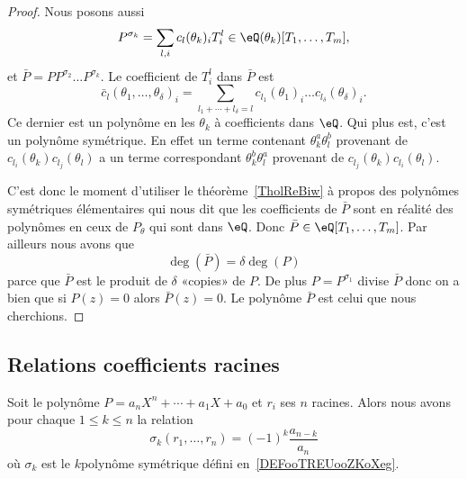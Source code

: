 \begin{proof}
    Nous posons aussi
    \begin{equation}
        P^{\sigma_k}=\sum_{l,i} c_l(\theta_k)_iT_i^l\in \eQ(\theta_k)[T_1,\ldots, T_m],
    \end{equation}
    et \( \bar P=PP^{\sigma_2}\ldots P^{\sigma_k}\). Le coefficient de \( T_i^l\) dans \( \bar P\) est
    \begin{equation}
        \bar c_l(\theta_1,\ldots, \theta_{\delta})_i=\sum_{l_1+\cdots +l_{\delta}=l}c_{l_1}(\theta_1)_i\ldots c_{l_{\delta}}(\theta_{\delta})_i.
    \end{equation}
    Ce dernier est un polynôme en les \( \theta_k\) à coefficients dans \( \eQ\). Qui plus est, c'est un polynôme symétrique. En effet un terme contenant \( \theta_k^a\theta_l^b\) provenant de \( c_{l_i}(\theta_k)c_{l_j}(\theta_l)\) a un terme correspondant \( \theta_k^b\theta_l^a\) provenant de \( c_{l_j}(\theta_k)c_{l_i}(\theta_l)\).

    C'est donc le moment d'utiliser le théorème~\ref{TholReBiw} à propos des polynômes symétriques élémentaires qui nous dit que les coefficients de \( \bar P\) sont en réalité des polynômes en ceux de \( P_{\theta}\) qui sont dans \( \eQ\). Donc \( \bar P\in \eQ[T_1,\ldots, T_m]\). Par ailleurs nous avons que
    \begin{equation}
        \deg(\bar P)=\delta \deg(P)
    \end{equation}
    parce que \( \bar P\) est le produit de \( \delta\) «copies»  de \( P\). De plus \( P=P^{\sigma_1}\) divise \( \bar P \) donc on a bien que si \( P(z)=0\) alors \( \bar P(z)=0\). Le polynôme \( \bar P\) est celui que nous cherchions.
\end{proof}

\subsection{Relations coefficients racines}

\begin{theorem} \label{ThoOQRgjpl}
    Soit le polynôme \( P=a_nX^n+\cdots +a_1X+a_0\) et \( r_i\) ses \( n\) racines. Alors nous avons pour chaque \( 1\leq k\leq n\) la relation
    \begin{equation}
        \sigma_k(r_1,\ldots, r_n)=(-1)^k\frac{ a_{n-k} }{ a_n }
    \end{equation}
    où \( \sigma_k\) est le \( k\)\ieme polynôme symétrique défini en~\ref{DEFooTREUooZKoXeg}.
\end{theorem}

